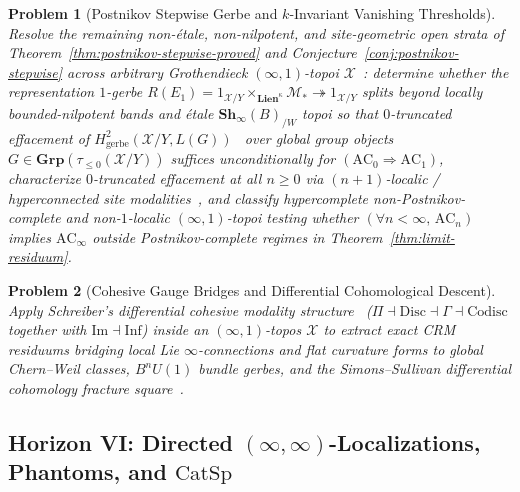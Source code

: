 \documentclass[10pt,twoside,openright]{book}
\theoremstyle{crmplain}
\newtheorem{problem}{Problem}[chapter]
\theoremstyle{crmdef}
\theoremstyle{crmremark}
\newcommand{\CohesiveQuad}{\Pi \dashv \mathrm{Disc} \dashv \Gamma \dashv \mathrm{Codisc}}
\begin{document}
\begin{problem}[Postnikov Stepwise Gerbe and $k$-Invariant Vanishing Thresholds]\label{prob:open-9}
Resolve the remaining non-\'etale, non-nilpotent, and site-geometric open strata of Theorem~\ref{thm:postnikov-stepwise-proved} and Conjecture~\ref{conj:postnikov-stepwise} across arbitrary Grothendieck $(\infty, 1)$-topoi $\mathcal{X}$~\cite{Lurie09}: determine whether the representation $1$-gerbe $R(E_1) = 1_{\mathcal{X}/Y} \times_{\mathbf{Lien}^\kappa} \mathcal{M}_* \twoheadrightarrow 1_{\mathcal{X}/Y}$ splits beyond locally bounded-nilpotent bands and \'etale $\mathbf{Sh}_\infty(B)_{/W}$ topoi so that $0$-truncated effacement of $H^2_{\mathrm{gerbe}}(\mathcal{X}/Y, L(G))$~\cite{Giraud71} over global group objects $G \in \mathbf{Grp}(\tau_{\le 0}(\mathcal{X}/Y))$ suffices unconditionally for $(\mathrm{AC}_0 \Rightarrow \mathrm{AC}_1)$, characterize $0$-truncated effacement at all $n \ge 0$ via $(n+1)$-localic / hyperconnected site modalities~\cite[\S6.4.5]{Lurie09}, and classify hypercomplete non-Postnikov-complete and non-$1$-localic $(\infty, 1)$-topoi testing whether $(\forall n < \infty,\, \mathrm{AC}_n)$ implies $\mathrm{AC}_\infty$ outside Postnikov-complete regimes in Theorem~\ref{thm:limit-residuum}.
\end{problem}

\begin{problem}[Cohesive Gauge Bridges and Differential Cohomological Descent]\label{prob:open-10}
Apply Schreiber's differential cohesive modality structure~\cite{Lawvere07,MoerdijkReyes91,Schreiber13} ($\CohesiveQuad$ together with $\mathrm{Im} \dashv \mathrm{Inf}$) inside an $(\infty, 1)$-topos $\mathcal{X}$ to extract exact CRM residuums bridging local Lie $\infty$-connections and flat curvature forms to global Chern--Weil classes, $B^n U(1)$ bundle gerbes, and the Simons--Sullivan differential cohomology fracture square~\cite{SimonsSullivan08,Schreiber13}.
\end{problem}

\subsection*{Horizon VI: Directed $(\infty, \infty)$-Localizations, Phantoms, and $\mathrm{CatSp}$}
\end{document}
